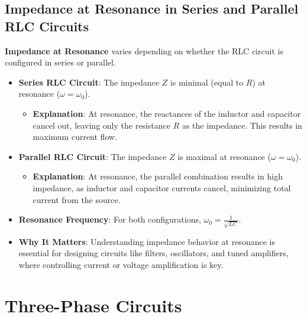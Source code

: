 \documentclass[12pt]{article}
\newcommand{\concept}[1]{\textbf{#1}}
\begin{document}
\subsection{Impedance at Resonance in Series and Parallel RLC Circuits}
\concept{Impedance at Resonance} varies depending on whether the RLC circuit is configured in series or parallel.
\begin{itemize}
    \item \textbf{Series RLC Circuit}: The impedance \(Z\) is minimal (equal to \(R\)) at resonance (\(\omega = \omega_0\)).
        \begin{itemize}
            \item \textbf{Explanation}: At resonance, the reactances of the inductor and capacitor cancel out, leaving only the resistance \(R\) as the impedance. This results in maximum current flow.
        \end{itemize}
    \item \textbf{Parallel RLC Circuit}: The impedance \(Z\) is maximal at resonance (\(\omega = \omega_0\)).
        \begin{itemize}
            \item \textbf{Explanation}: At resonance, the parallel combination results in high impedance, as inductor and capacitor currents cancel, minimizing total current from the source.
        \end{itemize}
    \item \textbf{Resonance Frequency}: For both configurations, \(\omega_0 = \frac{1}{\sqrt{L C}}\).
    \item \textbf{Why It Matters}: Understanding impedance behavior at resonance is essential for designing circuits like filters, oscillators, and tuned amplifiers, where controlling current or voltage amplification is key.
\end{itemize}
\section{Three-Phase Circuits}
\end{document}
